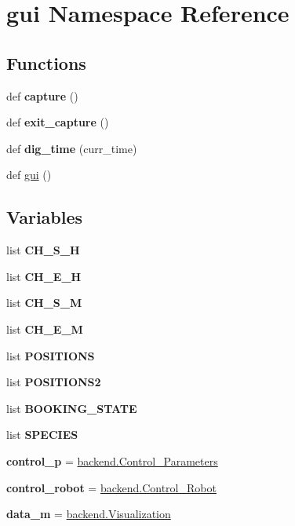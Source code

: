 \hypertarget{namespacegui}{}\section{gui Namespace Reference}
\label{namespacegui}
\subsection*{Functions}
\begin{DoxyCompactItemize}
\item 
\mbox{\label{namespacegui_a8fdb42e8de7af4197d2f83e56de6d925}} 
def {\bfseries capture} ()
\item 
\mbox{\label{namespacegui_ab7a5b92e4dc78238af7f6b993e036398}} 
def {\bfseries exit\+\_\+capture} ()
\item 
\mbox{\label{namespacegui_a37d0591f7fdeb82b9fba628bbbd61601}} 
def {\bfseries dig\+\_\+time} (curr\+\_\+time)
\item 
def \hyperlink{namespacegui_a2ff258a53db853fc799c84dcda97617d_a2ff258a53db853fc799c84dcda97617d}{gui} ()
\end{DoxyCompactItemize}
\subsection*{Variables}
\begin{DoxyCompactItemize}
\item 
list {\bfseries C\+H\+\_\+\+S\+\_\+H}
\item 
list {\bfseries C\+H\+\_\+\+E\+\_\+H}
\item 
list {\bfseries C\+H\+\_\+\+S\+\_\+M}
\item 
list {\bfseries C\+H\+\_\+\+E\+\_\+M}
\item 
list {\bfseries P\+O\+S\+I\+T\+I\+O\+NS}
\item 
list {\bfseries P\+O\+S\+I\+T\+I\+O\+N\+S2}
\item 
list {\bfseries B\+O\+O\+K\+I\+N\+G\+\_\+\+S\+T\+A\+TE}
\item 
list {\bfseries S\+P\+E\+C\+I\+ES}
\item 
\mbox{\label{namespacegui_a703f5ed1f49fa6c9d1fdcde6f95f007d}} 
{\bfseries control\+\_\+p} = \hyperlink{classbackend_1_1Control__Parameters}{backend.\+Control\+\_\+\+Parameters}
\item 
\mbox{\label{namespacegui_a5705236c678b99f6b8dc2001f4558e71}} 
{\bfseries control\+\_\+robot} = \hyperlink{classbackend_1_1Control__Robot}{backend.\+Control\+\_\+\+Robot}
\item 
\mbox{\label{namespacegui_a41cb0f0420800118de0f19a9655bcbee}} 
{\bfseries data\+\_\+m} = \hyperlink{classbackend_1_1Visualization}{backend.\+Visualization}
\end{DoxyCompactItemize}


